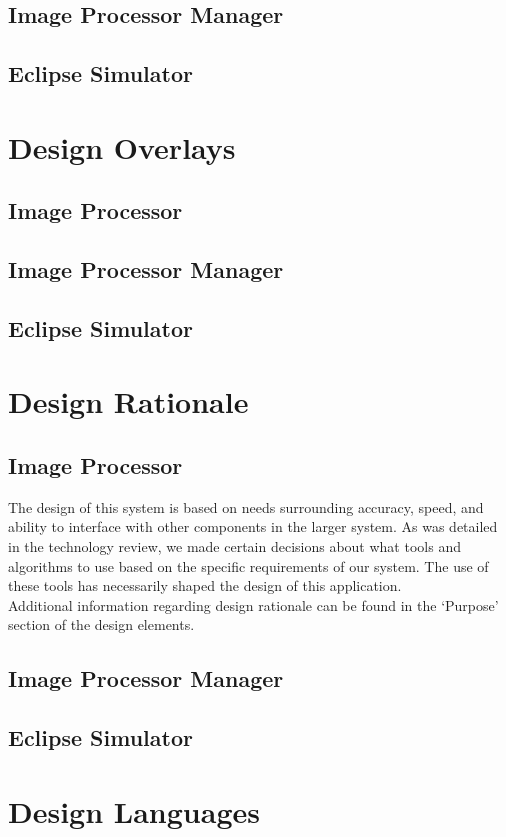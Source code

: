 \documentclass[10pt, onecolumn, draftclsnofoot, letterpaper, compsoc]{IEEEtran}
\begin{document}
\subsection{Image Processor Manager}

\subsection{Eclipse Simulator}


\section{Design Overlays}

\subsection{Image Processor}

\subsection{Image Processor Manager}

\subsection{Eclipse Simulator}


\section{Design Rationale}

\subsection{Image Processor}

The design of this system is based on needs surrounding accuracy, speed, and
ability to interface with other components in the larger system. As was detailed
in the technology review, we made certain decisions about what tools and
algorithms to use based on the specific requirements of our system. The use of
these tools has necessarily shaped the design of this application.\\

Additional information regarding design rationale can be found in the `Purpose'\\
section of the design elements.

\subsection{Image Processor Manager}

\subsection{Eclipse Simulator}

\section{Design Languages}


\newpage



\end{document}

